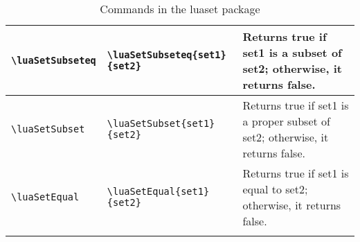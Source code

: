 \documentclass{article}
\begin{document}
\begin{center}
\begin{longtable}{llm{5cm}}
\begin{lstlisting}
\luaSetSubseteq
\end{lstlisting} &
\begin{lstlisting}
\luaSetSubseteq{set1}{set2}
\end{lstlisting} & Returns true if set1 is a subset of set2; otherwise, it returns false. \\
\midrule
\begin{lstlisting}
\luaSetSubset
\end{lstlisting} &
\begin{lstlisting}
\luaSetSubset{set1}{set2}
\end{lstlisting} & Returns true if set1 is  a proper subset of set2; otherwise, it returns false. \\
\midrule
\begin{lstlisting}
\luaSetEqual
\end{lstlisting} &
\begin{lstlisting}
\luaSetEqual{set1}{set2}
\end{lstlisting} & Returns true if set1 is equal to set2; otherwise, it returns false. \\ 
\bottomrule
\caption{Commands in the luaset package}
\label{tbl:opluaset}
\end{longtable}
\end{center}
\end{document}
